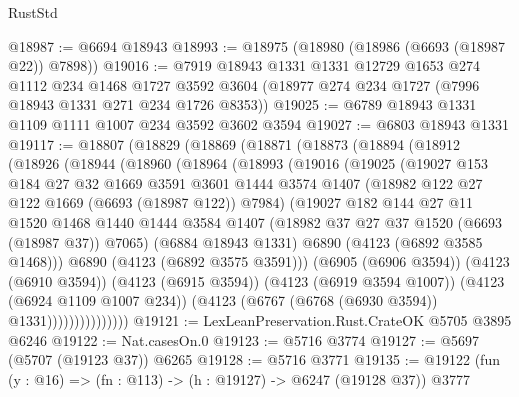 \begin{lexlean}{RustStd}
\begin{coremodule}
@18987 := @6694 @18943
@18993 := @18975 (@18980 (@18986 (@6693 (@18987 @22)) @7898))
@19016 := @7919
    @18943
    @1331
    @1331
    @12729
    @1653
    @274
    @1112
    @234
    @1468
    @1727
    @3592
    @3604
    (@18977 @274 @234 @1727 (@7996 @18943 @1331 @271 @234 @1726 @8353))
@19025 := @6789 @18943 @1331 @1109 @1111 @1007 @234 @3592 @3602 @3594
@19027 := @6803 @18943 @1331
@19117 := @18807
    (@18829
      (@18869
        (@18871
          (@18873
            (@18894
              (@18912
                (@18926
                  (@18944
                    (@18960
                      (@18964
                        (@18993
                          (@19016
                            (@19025
                              (@19027
                                @153
                                @184
                                @27
                                @32
                                @1669
                                @3591
                                @3601
                                @1444
                                @3574
                                @1407
                                (@18982 @122 @27 @122 @1669 (@6693 (@18987 @122)) @7984)
                                (@19027
                                  @182
                                  @144
                                  @27
                                  @11
                                  @1520
                                  @1468
                                  @1440
                                  @1444
                                  @3584
                                  @1407
                                  (@18982 @37 @27 @37 @1520 (@6693 (@18987 @37)) @7065)
                                  (@6884 @18943 @1331)
                                  @6890
                                  (@4123 (@6892 @3585 @1468)))
                                @6890
                                (@4123 (@6892 @3575 @3591)))
                              (@6905 (@6906 @3594))
                              (@4123 (@6910 @3594))
                              (@4123 (@6915 @3594))
                              (@4123 (@6919 @3594 @1007))
                              (@4123 (@6924 @1109 @1007 @234))
                              (@4123 (@6767 (@6768 (@6930 @3594)) @1331)))))))))))))))
@19121 := LexLeanPreservation.Rust.CrateOK @5705 @3895 @6246
@19122 := Nat.casesOn.{0}
@19123 := @5716 @3774
@19127 := @5697 (@5707 (@19123 @37)) @6265
@19128 := @5716 @3771
@19135 := @19122 (fun (y : @16) => (fn : @113) -> (h : @19127) -> @6247 (@19128 @37)) @3777

\end{coremodule}
\end{lexlean}
